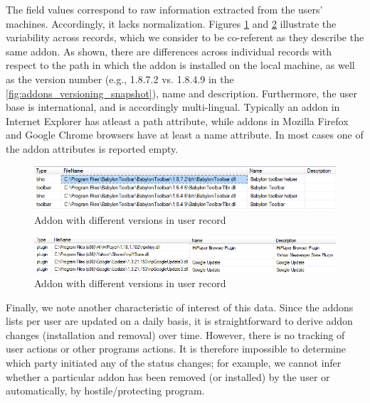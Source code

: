 \documentclass[11pt,oneside]{book}
\begin{document}
The field values correspond to raw information extracted from the users' machines. Accordingly, it lacks normalization. Figures \ref{fig:addons_versioning_snapshot} and \ref{fig:addons_versioning_snapshot_desc} illustrate the variability across records, which we consider to be co-referent as they describe the same addon. As shown, there are differences across individual records with respect to the path in which the addon is installed on the local machine, as well as the version number (e.g., 1.8.7.2 vs. 1.8.4.9 in the \autoref{fig:addons_versioning_snapshot}), name and description. Furthermore, the user base is international, and is accordingly multi-lingual.   Typically an addon in Internet Explorer has atleast a path attribute, while addons in Mozilla Firefox and Google Chrome browsers have at least a name attribute. In most cases one of the addon attributes is reported empty.

\begin{figure}[t]
\centering
\begin{small}
\includegraphics[scale=.8,angle=0]{figures/addons_versioning_snapshot.png}
\end{small}
\caption{Addon with different versions in user record}
\label{fig:addons_versioning_snapshot}
\end{figure}

\begin{figure}[t]
\centering
\begin{small}
\includegraphics[scale=.8,angle=0]{figures/addons_versioning_snapshot_desc.png}
\end{small}
\caption{Addon with different versions in user record}
\label{fig:addons_versioning_snapshot_desc}
\end{figure}

Finally, we note another characteristic of interest of this data.  Since the addons lists per user are updated on a daily basis, it is straightforward to derive addon changes (installation and removal) over time. However, there is no tracking of user actions or other programs actions. It is therefore impossible to determine which party initiated any of the status changes; for example, we cannot infer whether a particular addon has been removed (or installed) by the user or automatically, by hostile/protecting program. 
\end{document}
